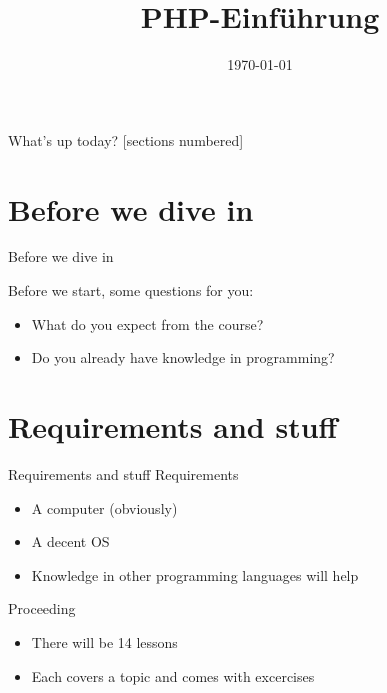 	


\newcommand{\topic}{
	PHP-Einführung
}

\title{\topic}
\date{\today}



\maketitle

\begin{frame}{What's up today?}
	[sections numbered]
	\tableofcontents
\end{frame}

\section{Before we dive in}

\begin{frame}{Before we dive in}

	Before we start, some questions for you:
	\pause
	\begin{itemize}
        \item What do you expect from the course? 	\pause
		\item Do you already have knowledge in programming?
	\end{itemize}
\end{frame}


\section{Requirements and stuff}

\begin{frame}{Requirements and stuff}
	Requirements
	
	\begin{itemize}
        \item A computer (obviously) 	\pause
		\item A decent OS 	\pause
		\item Knowledge in other programming languages will help 	\pause
	\end{itemize}
	Proceeding
	
	\begin{itemize}
		\item There will be 14 lessons
		\item Each covers a topic and comes with excercises
	\end{itemize}
\end{frame}

